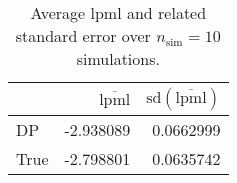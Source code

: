 \begin{table}[H]

\caption{Average lpml and related standard error over $n_{\text{sim}} = 10$ simulations.}
\centering
\begin{tabular}[t]{lrr}
\toprule
  & $\overbar{\text{lpml}}$ & $\text{sd}(\overbar{\text{lpml}})$\\
\midrule
DP & -2.938089 & 0.0662999\\
True & -2.798801 & 0.0635742\\
\bottomrule
\end{tabular}
\end{table}